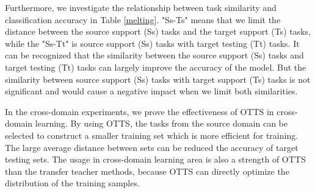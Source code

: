 \documentclass[10pt,journal,compsoc]{IEEEtran}
\begin{document}

Furthermore, we investigate the relationship between task similarity and classification accuracy in Table \ref{melting}. "Ss-Ts" means that we limit the distance between the source support (Ss) tasks and the target support (Ts) tasks, while the "Ss-Tt" is source support (Ss) tasks with target testing (Tt) tasks. It can be recognized that the similarity between the source support (Ss) tasks and target testing (Tt) tasks can largely improve the accuracy of the model. But the similarity between source support (Ss) tasks with target support (Ts) tasks is not significant and would cause a negative impact when we limit both similarities.


In the cross-domain experiments, we prove the effectiveness of OTTS in cross-domain learning. By using OTTS, the tasks from the source domain can be selected to construct a smaller training set which is more efficient for training. The large average distance between sets can be reduced the accuracy of target testing sets. The usage in cross-domain learning area is also a strength of OTTS than the transfer teacher methods, because OTTS can directly optimize the distribution of the training samples. 







%
%
\end{document}
